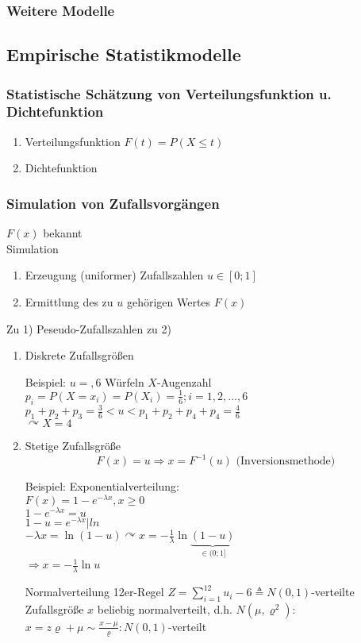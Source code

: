 \documentclass[a4paper]{scrartcl}
\begin{document}
\subsubsection{Weitere Modelle}
\subsection{Empirische Statistikmodelle}
\subsubsection{Statistische Schätzung von Verteilungsfunktion u. Dichtefunktion}
\begin{enumerate}
\item Verteilungsfunktion $F(t) = P(X \leq t) $
\item Dichtefunktion
\end{enumerate}
\subsubsection{Simulation von Zufallsvorgängen}
$F(x)$ bekannt\\
Simulation
\begin{enumerate}
\item Erzeugung (uniformer) Zufallszahlen $u \in [0;1]$
\item Ermittlung des zu $u$ gehörigen Wertes $F(x)$
\end{enumerate}
Zu 1) Peseudo-Zufallszahlen zu 2)
\begin{enumerate}
\item Diskrete Zufallsgrößen

Beispiel: $u=,6$ Würfeln $X$-Augenzahl\\
$p_i = P(X = x_i) = P(X_i) = \frac{1}{6}; i = 1,2,\dots ,6$\\
$p_1+p_2+p_3 = \frac{3}{6} < u < p_1 + p_2 + p_4 + p_4 = \frac{4}{6}$\\
$\curvearrowright X = 4$

\item Stetige Zufallsgröße
\[ F(x) = u \Rightarrow x = F^{-1} (u) \text{ (Inversionsmethode)} \]

Beispiel: Exponentialverteilung:\\
$F(x) = 1- e^{-\lambda x}, x \geq 0$\\
$1-e^{-\lambda x} = u$\\
$1-u = e^{-\lambda x} | ln$\\
$-\lambda x  = \ln{(1-u)} \curvearrowright x = -\frac{1}{\lambda} \ln{\underbrace{(1-u)}_{\in (0;1]}}$\\
$\Rightarrow x = -\frac{1}{\lambda} \ln{u}$

Normalverteilung 12er-Regel
$ Z = \sum\limits_{i=1}^{12} u_i -6 \triangleq N(0,1)$-verteilte Zufallsgröße
$x$ beliebig normalverteilt, d.h. $N(\mu,\varrho^2):$
$x = z \varrho + \mu \sim \frac{x-\mu}{\varrho} : N(0,1)$-verteilt

\end{enumerate}
\end{document}
